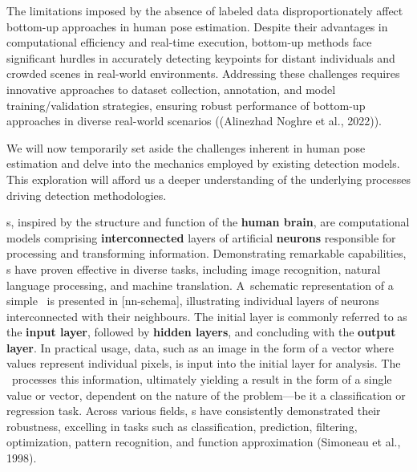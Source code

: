 The limitations imposed by the absence of labeled data disproportionately affect bottom-up approaches in human pose estimation. Despite their advantages in computational efficiency and real-time execution, bottom-up methods face significant hurdles in accurately detecting keypoints for distant individuals and crowded scenes in real-world environments. Addressing these challenges requires innovative approaches to dataset collection, annotation, and model training/validation strategies, ensuring robust performance of bottom-up approaches in diverse real-world scenarios ((\scc Alinezhad Noghre et al., 2022)).

We will now temporarily set aside the challenges inherent in human pose estimation and delve into the mechanics employed by existing detection models. This exploration will afford us a deeper understanding of the underlying processes driving detection methodologies.

\NN\-s, inspired by the structure and function of the {\bf human brain}, are computational models comprising {\bf interconnected} layers of artificial {\bf neurons} responsible for processing and transforming information. Demonstrating remarkable capabilities, \NN\-s have proven effective in diverse tasks, including image recognition, natural language processing, and machine translation. A~schematic representation of a simple \NN\ is presented in [nn-schema], illustrating individual layers of neurons interconnected with their neighbours. The initial layer is commonly referred to as the {\bf input layer}, followed by {\bf hidden layers}, and concluding with the {\bf output layer}. In practical usage, data, such as an image in the form of a vector where values represent individual pixels, is input into the initial layer for analysis. The \NN\ processes this information, ultimately yielding a result in the form of a single value or vector, dependent on the nature of the problem—be it a classification or regression task. Across various fields, \NN\-s have consistently demonstrated their robustness, excelling in tasks such as classification, prediction, filtering, optimization, pattern recognition, and function approximation (\scc Simoneau et al., 1998).


